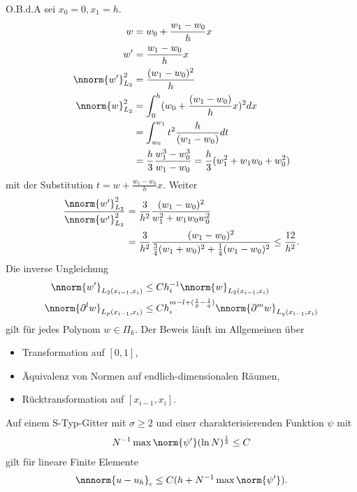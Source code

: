 \begin{beweis}O.B.d.A sei $x_{0} = 0, x_{1} = h$. 
  \begin{align*} 
    w &= w_{0} + \frac{w_{1} - w_{0}} h x\\
    w' &=\frac{w_{1} - w_{0}} h x\\
    \nnorm{w'}_{L_{2}}^{2} &=\frac{(w_{1} - w_{0})^{2}} h \\
    \nnorm{w}_{L_{2}}^{2} &= \int_{0}^{h} (w_{0} + \frac{(w_{1} - w_{0})} hx)^{2} dx \\
    &= \int_{w_{0}}^{w_{1}} t^{2} \frac{ h }{(w_{1} - w_{0})} dt \\
    &= \frac h 3 \frac{w_{1}^{3} - w_{0}^{3}}{w_{1} - w_{0}} = \frac h 3 (w_{1}^{2} + w_{1}w_{0} + w_{0}^{2})
  \end{align*}
  mit der Substitution $t = w + \frac {w_{1} - w_{0}} h x$. Weiter
  \begin{align*}
    \frac {\nnorm {w'}_{L_{2}}^{2}}{\nnorm {w'}_{L_{2}}^{2}} &= \frac 3 {h^{2}} \frac{(w_{1} - w_{0})^{2}} {w_{1}^{2} + w_{1}w_{0} w_{0}^{2}} \\
    &= \frac 3 {h^{2}} \frac {(w_{1} - w_{0})^{2}}{\frac 34 (w_{1} + w_{0})^{2} + \frac 14 (w_{1} - w_{0})^{2}} \leq \frac {12}{h^{2}}. 
  \end{align*}
  Die inverse Ungleichung
  \begin{align*}
    \nnorm{w'}_{L_{2}(x_{i-1}, x_{i})} &\leq  C h_{i}^{-1} \nnorm{w}_{L_{2}(x_{i-1}, x_{i})}\\
    \nnorm{\partial^{l} w}_{L_{p}(x_{i-1}, x_{i})} &\leq  C h_{i}^{m - l + (\frac 1 p - \frac 1 q)} \nnorm{\partial^{m} w}_{L_{q}(x_{i-1}, x_{i})}\\
  \end{align*}
  gilt für jedes Polynom $w \in \Pi_{k}$. Der Beweis läuft im Allgemeinen über
  \begin{itemize}
  \item Transformation auf $[0, 1]$, 
  \item Äquivalenz von Normen auf endlich-dimensionalen Räumen, 
  \item Rücktransformation auf $[x_{i-1}, x_{i}]$. 
  \end{itemize}
\end{beweis}
\begin{satz}\label{thm:6-15}
  Auf einem S-Typ-Gitter mit $\sigma \geq 2$ und einer charakterisierenden Funktion $\psi$ mit
  \begin{align*}
    N^{-1} \max \norm{\psi'}(\ln N)^{\frac 12} \leq C
  \end{align*}
  gilt für lineare Finite Elemente
  \begin{align*}
    \nnnorm{u-u_{h}}_{\epsilon} \leq C (h + N^{-1} \max \norm{\psi'}). 
  \end{align*}
\end{satz}
